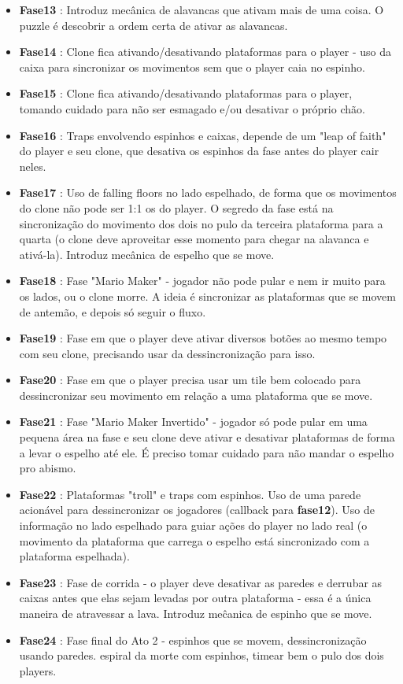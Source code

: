 \documentclass[a4paper, 11pt]{article}
\begin{document}
\begin{itemize}
	\begin{itemize} 
		\item \textbf{Fase13} : Introduz mecânica de alavancas que ativam mais de uma coisa. O puzzle é descobrir a ordem certa de ativar as alavancas.
		\item \textbf{Fase14} : Clone fica ativando/desativando plataformas para o player - uso da caixa para sincronizar os movimentos sem que o player caia no espinho.
		\item \textbf{Fase15} : Clone fica ativando/desativando plataformas para o player, tomando cuidado para não ser esmagado e/ou desativar o próprio chão.
		\item \textbf{Fase16} : Traps envolvendo espinhos e caixas, depende de um "leap of faith" do player e seu clone, que desativa os espinhos da fase antes do player cair neles.
		\item \textbf{Fase17} : Uso de falling floors no lado espelhado, de forma que os movimentos do clone não pode ser 1:1 os do player. O segredo da fase está na sincronização do movimento dos dois no pulo da terceira plataforma para a quarta (o clone deve aproveitar esse momento para chegar na alavanca e ativá-la). Introduz mecânica de espelho que se move.
		\item \textbf{Fase18} : Fase "Mario Maker" - jogador não pode pular e nem ir muito para os lados, ou o clone morre. A ideia é sincronizar as plataformas que se movem de antemão, e depois só seguir o fluxo.
		\item \textbf{Fase19} : Fase em que o player deve ativar diversos botões ao mesmo tempo com seu clone, precisando usar da dessincronização para isso.
		\item \textbf{Fase20} : Fase em que o player precisa usar um tile bem colocado para dessincronizar seu movimento em relação a uma plataforma que se move.
		\item \textbf{Fase21} : Fase "Mario Maker Invertido" - jogador só pode pular em uma pequena área na fase e seu clone deve ativar e desativar plataformas de forma a levar o espelho até ele. É preciso tomar cuidado para não mandar o espelho pro abismo.
		\item \textbf{Fase22} : Plataformas "troll" e traps com espinhos. Uso de uma parede acionável para dessincronizar os jogadores (callback para \textbf{fase12}). Uso de informação no lado espelhado para guiar ações do player no lado real (o movimento da plataforma que carrega o espelho está sincronizado com a plataforma espelhada).
		\item \textbf{Fase23} : Fase de corrida - o player deve desativar as paredes e derrubar as caixas antes que elas sejam levadas por outra plataforma - essa é a única maneira de atravessar a lava. Introduz meĉanica de espinho que se move.
		\item \textbf{Fase24} : Fase final do Ato 2 - espinhos que se movem, dessincronização usando paredes. espiral da morte com espinhos, timear bem o pulo dos dois players.
	\end{itemize} 
 

\end{itemize}
\end{document}
